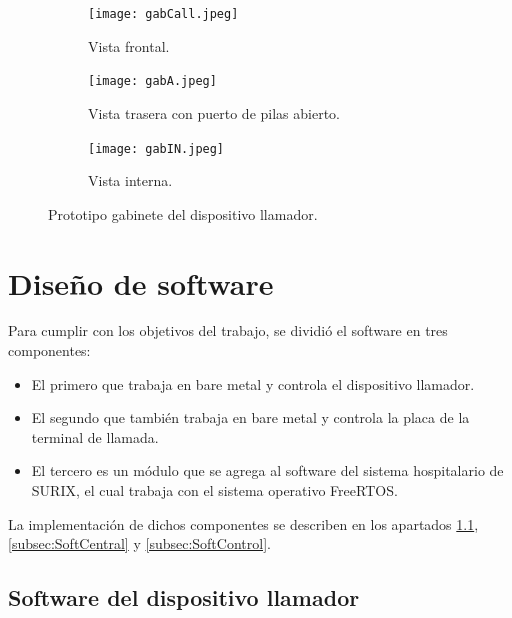 \begin{figure}[htpb]
	\centering
   	\begin{subfigure}[b]{0.3\textwidth}
   		\centering
      	\texttt{[image: gabCall.jpeg]}
      	\caption{Vista frontal.}
   	\end{subfigure}%
   	\begin{subfigure}[b]{0.3\textwidth}
   		\centering
      	\texttt{[image: gabA.jpeg]}
      	\caption{Vista trasera con puerto de pilas abierto.}
   	\end{subfigure}%
   	\begin{subfigure}[b]{0.3\textwidth}
   		\centering
      	\texttt{[image: gabIN.jpeg]}
      	\caption{Vista interna.}
   	\end{subfigure}%
	\caption{Prototipo gabinete del dispositivo llamador.}
	\label{fig:gabinete}
\end{figure}


\section{Diseño de software}

Para cumplir con los objetivos del trabajo, se dividió el software en tres componentes:

\begin{itemize}

\item El primero que trabaja en bare metal y controla el dispositivo llamador.

\item El segundo que también trabaja en bare metal y controla la placa de la terminal de llamada.

\item El tercero es un módulo que se agrega al software del sistema hospitalario de SURIX, el cual trabaja con el sistema operativo FreeRTOS.

\end{itemize}

La implementación de dichos componentes se describen en los apartados \ref{subsec:SoftLlam}, \ref{subsec:SoftCentral} y \ref{subsec:SoftControl}.

\subsection{Software del dispositivo llamador}
\label{subsec:SoftLlam}

